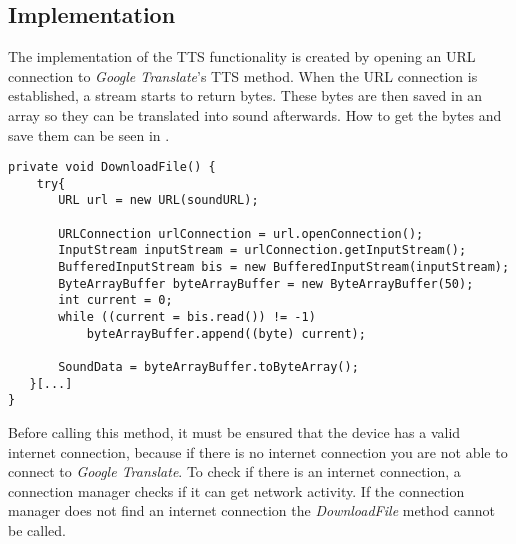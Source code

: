 \subsection{Implementation}
The implementation of the TTS functionality is created by opening an URL connection to \textit{Google Translate}'s TTS method.
When the URL connection is established, a stream starts to return bytes.
These bytes are then saved in an array so they can be translated into sound afterwards.
How to get the bytes and save them can be seen in .

\begin{lstlisting}[caption={\textit{DownloadFile} method},label={lst:download-sound}]
private void DownloadFile() {
    try{
       URL url = new URL(soundURL);

       URLConnection urlConnection = url.openConnection();
       InputStream inputStream = urlConnection.getInputStream();
       BufferedInputStream bis = new BufferedInputStream(inputStream);
       ByteArrayBuffer byteArrayBuffer = new ByteArrayBuffer(50);
       int current = 0;
       while ((current = bis.read()) != -1)
           byteArrayBuffer.append((byte) current);

       SoundData = byteArrayBuffer.toByteArray();
   }[...]
}
\end{lstlisting} 

Before calling this method, it must be ensured that the device has a valid internet connection, because if there is no internet connection you are not able to connect to \textit{Google Translate}.
To check if there is an internet connection, a connection manager checks if it can get network activity.
If the connection manager does not find an internet connection the \textit{DownloadFile} method cannot be called.